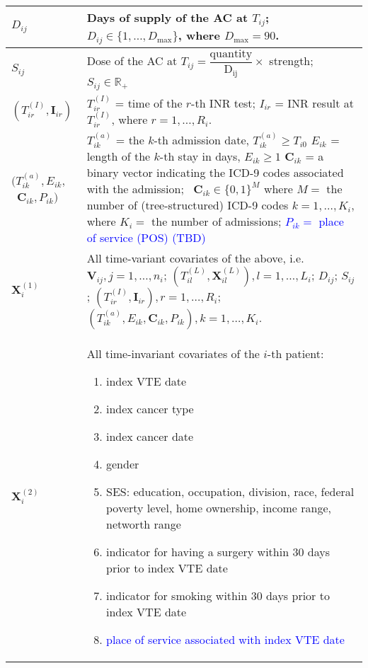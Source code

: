 \documentclass[11pt]{article}
\makeatletter
\newcommand{\R}{\mathbb{R}}
\newcommand{\specialcell}[2][c]{%
  \begin{tabular}[#1]{@{}l@{}}#2\end{tabular}}
\makeatother
\begin{document}
\begin{center}
\begin{longtable}{| p{2.5cm} | p{14cm} |}
    \hline
    $D_{ij}$ & Days of supply of the AC at $T_{ij}$; $D_{ij} \in \{1, \ldots, D_{\mathrm{max}} \}$,  where $D_{\mathrm{max}} = 90$. \\
    \hline 
    $S_{ij}$ & Dose of the AC at $T_{ij} = \dfrac{\mathrm{quantity}}{\mathrm{D_{ij}}} \times$ strength; $S_{ij} \in \R_+$ \\
    \hline
    $(T_{ir}^{(I)}, \bm I_{ir})$ & $T_{ir}^{(I)}$ = time of the $r$-th INR test; $I_{ir}$ = INR result at $T_{ir}^{(I)}$, where $r = 1, \ldots, R_i$. \\
    \hline
    \specialcell{ $(T_{ik}^{(a)}, E_{ik},$ \\ \ $\bm C_{ik}, P_{ik})$ } & \specialcell{ $T_{ik}^{(a)}$ = the $k$-th admission date, $T_{ik}^{(a)} \geq T_{i0}$ \\ $E_{ik}$ = length of the $k$-th stay in days, $E_{ik} \geq 1$ \\ $\bm C_{ik}$ = a binary vector indicating the ICD-9 codes associated with the admission; \\ \ $\bm C_{ik} \in \{0,1\}^M$ where $M=$ the number of (tree-structured) ICD-9 codes \\ $k = 1,\ldots, K_i$, where $K_i = $ the number of admissions; \\ \textcolor{blue}{$P_{ik} = $ place of service (POS) (TBD)} } \\
    \hline\hline
    $\bm X_i^{(1)}$ & All time-variant covariates of the above, i.e. $\bm V_{ij}, j=1,\ldots, n_i$; $(T_{il}^{(L)}, \bm X_{il}^{(L)}), l=1,\ldots,L_i$; $D_{ij}$; $S_{ij}$; $(T_{ir}^{(I)}, \bm I_{ir}), r = 1, \ldots, R_i$; $(T_{ik}^{(a)}, E_{ik}, \bm C_{ik}, P_{ik}), k = 1,\ldots, K_i$. \\
    \hline\hline
    $\bm X_i^{(2)}$ & All time-invariant covariates of the $i$-th patient: 
    \begin{enumerate}
        \item index VTE date
        \item index cancer type
        \item index cancer date
        \item gender
        \item SES: education, occupation, division, race, federal poverty level, home ownership, income range, networth range
        \item indicator for having a surgery within 30 days prior to index VTE date
        \item indicator for smoking within 30 days prior to index VTE date
        \item \textcolor{blue}{ place of service associated with index VTE date }
    \end{enumerate} \\
    \hline
\end{longtable}
\end{center}
\end{document}
